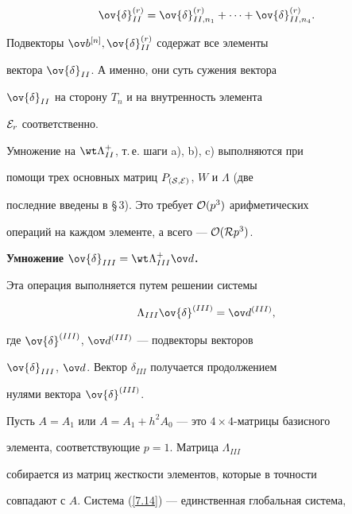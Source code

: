 $$


\ov {\delta}^{(r)}_{II}=\ov {\delta}^{(r)}_{II,n_1}+\dotsb+


\ov {\delta}^{(r)}_{II,n_4}.


$$


Подвекторы $\ov b^{[n]},\ov {\delta}^{(r)}_{II}$ содержат все элементы 


вектора $\ov {\delta}_{II}$. А именно, они суть сужения вектора 


$\ov {\delta}_{II}$ на сторону $T_n$ и на внутренность элемента 


${\cal E}_r$ соответственно.





Умножение на $\wt \Lambda^{+}_{II}$, т.\,е. шаги a), b), c) выполняются при 


помощи трех основных матриц $P_{({\cal S,E})}$, $W$ и $\Lambda$ (две 


последние введены в \S\,3). Это требует ${\cal O}(p^3)$ арифметических 


операций на каждом элементе, а всего --- ${\cal O}({\cal R}p^3)$. 





{\bf Умножение $\ov{\delta}_{III}=\wt \Lambda^{+}_{III} \ov d$.}


Эта операция выполняется путем решении системы 


\begin{equation}


\Lambda_{III}\ov {\delta}^{(III)}=\ov d^{(III)},


\label{7.14}


\end{equation} 


где $\ov{ \delta}^{(III)}$, $\ov d^{(III)}$ --- подвекторы векторов 


$\ov{\delta}_{III}$, $\ov d$. Вектор ${\delta}_{III}$ получается продолжением 


нулями вектора $\ov{\delta}^{(III)}$. 





Пусть $A=A_1$ или $A=A_1+h^2A_0$ --- это $4{\times}4$-матрицы базисного 


элемента, соответствующие $p=1$. Матрица ${\Lambda}_{III}$ 


собирается из матриц жесткости элементов, которые в точности 


совпадают с $A$. Система (\ref{7.14}) --- единственная глобальная система, 


